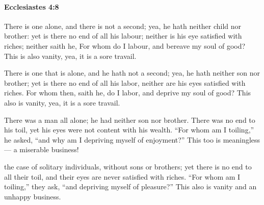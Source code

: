 		\paragraph{Ecclesiastes 4:8} %
			\label{ECCLESIASTES-4-8}

			There is one alone, and there is not a second; yea, he hath neither child nor brother: yet is there no end of all his labour; neither is his eye satisfied with riches; neither saith he, For whom do I labour, and bereave my soul of good? This is also vanity, yea, it is a sore travail.

			\begin{versebox}
					\item[BHS] 
					\item[LXX] 
					\item[ASV] There is one that is alone, and he hath not a second; yea, he hath neither son nor brother; yet is there no end of all his labor, neither are his eyes satisfied with riches. For whom then, saith he, do I labor, and deprive my soul of good? This also is vanity, yea, it is a sore travail.
					\item[NIV] There was a man all alone; he had neither son nor brother. There was no end to his toil, yet his eyes were not content with his wealth. “For whom am I toiling,” he asked, “and why am I depriving myself of enjoyment?” This too is meaningless— a miserable business!
					\item[NRSV] the case of solitary individuals, without sons or brothers; yet there is no end to all their toil, and their eyes are never satisfied with riches. “For whom am I toiling,” they ask, “and depriving myself of pleasure?” This also is vanity and an unhappy business.
			\end{versebox}

